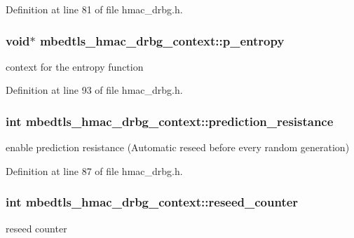 Definition at line 81 of file hmac\-\_\-drbg.\-h.

\hypertarget{structmbedtls__hmac__drbg__context_a218d146b662c9795b9f05b94fa482790}{
\subsubsection[{p\-\_\-entropy}]{\setlength{\rightskip}{0pt plus 5cm}void$\ast$ mbedtls\-\_\-hmac\-\_\-drbg\-\_\-context\-::p\-\_\-entropy}}\label{structmbedtls__hmac__drbg__context_a218d146b662c9795b9f05b94fa482790}
context for the entropy function 

Definition at line 93 of file hmac\-\_\-drbg.\-h.

\hypertarget{structmbedtls__hmac__drbg__context_a2c486e648011f32883056541249f7a80}{
\subsubsection[{prediction\-\_\-resistance}]{\setlength{\rightskip}{0pt plus 5cm}int mbedtls\-\_\-hmac\-\_\-drbg\-\_\-context\-::prediction\-\_\-resistance}}\label{structmbedtls__hmac__drbg__context_a2c486e648011f32883056541249f7a80}
enable prediction resistance (Automatic reseed before every random generation) 

Definition at line 87 of file hmac\-\_\-drbg.\-h.

\hypertarget{structmbedtls__hmac__drbg__context_a3bdabbbda4d50c954907f5db1f8cecaf}{
\subsubsection[{reseed\-\_\-counter}]{\setlength{\rightskip}{0pt plus 5cm}int mbedtls\-\_\-hmac\-\_\-drbg\-\_\-context\-::reseed\-\_\-counter}}\label{structmbedtls__hmac__drbg__context_a3bdabbbda4d50c954907f5db1f8cecaf}
reseed counter 

